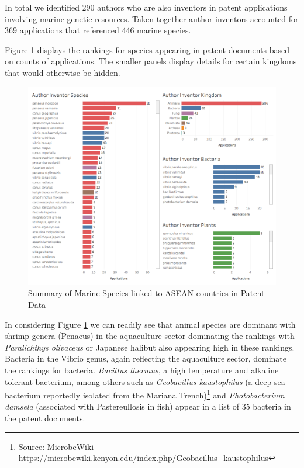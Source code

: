 \documentclass[openany]{book}
\let\rmarkdownfootnote\footnote%
\def\footnote{\protect\rmarkdownfootnote}
\theoremstyle{definition}
\theoremstyle{definition}
\theoremstyle{definition}
\theoremstyle{remark}
\begin{document}
In total we identified 290 authors who are also inventors in patent
applications involving marine genetic resources. Taken together author
inventors accounted for 369 applications that referenced 446 marine
species.

Figure \ref{fig:authorinventorspecies} displays the rankings for species
appearing in patent documents based on counts of applications. The
smaller panels display details for certain kingdoms that would otherwise
be hidden.

\begin{figure}

{\centering \includegraphics[width=1\linewidth]{images-patents/author_inventor_species_dashboard} 

}

\caption{Summary of Marine Species linked to ASEAN countries in Patent Data}\label{fig:authorinventorspecies}
\end{figure}

In considering Figure \ref{fig:authorinventorspecies} we can readily see
that animal species are dominant with shrimp genera (Penaeus) in the
aquaculture sector dominating the rankings with \emph{Paralichthys
olivaceus} or Japanese halibut also appearing high in these rankings.
Bacteria in the Vibrio genus, again reflecting the aquaculture sector,
dominate the rankings for bacteria. \emph{Bacillus thermus}, a high
temperature and alkaline tolerant bacterium, among others such as
\emph{Geobacillus kaustophilus} (a deep sea bacterium reportedly
isolated from the Mariana Trench)\footnote{Source: MicrobeWiki
  \url{https://microbewiki.kenyon.edu/index.php/Geobacillus_kaustophilus}}
and \emph{Photobacterium damsela} (associated with Pastereullosis in
fish) appear in a list of 35 bacteria in the patent documents.
\end{document}
